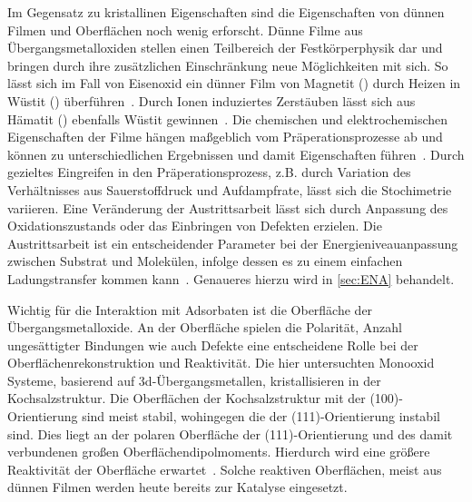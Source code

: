         Im Gegensatz zu kristallinen Eigenschaften sind die Eigenschaften von dünnen Filmen und Oberflächen noch wenig erforscht.
        Dünne Filme aus Übergangsmetalloxiden stellen einen Teilbereich der Festkörperphysik dar und bringen durch ihre zusätzlichen Einschränkung neue Möglichkeiten mit sich.
        So lässt sich im Fall von Eisenoxid ein dünner Film von Magnetit () durch Heizen in Wüstit () überführen~\cite{FeO_1}.
        Durch Ionen induziertes Zerstäuben lässt sich aus Hämatit () ebenfalls Wüstit gewinnen~\cite{FeO_36}.
        Die chemischen und elektrochemischen Eigenschaften der Filme hängen maßgeblich vom Präperationsprozesse ab und können zu unterschiedlichen Ergebnissen und damit Eigenschaften führen~\cite{Uni-Tübingen}.
        Durch gezieltes Eingreifen in den Präperationsprozess, z.B. durch Variation des Verhältnisses aus Sauerstoffdruck und Aufdampfrate, lässt sich die Stochimetrie variieren.
        Eine Veränderung der Austrittsarbeit lässt sich durch Anpassung des Oxidationszustands oder das Einbringen von Defekten erzielen.
        Die Austrittsarbeit ist ein entscheidender Parameter bei der Energieniveauanpassung zwischen Substrat und Molekülen, infolge dessen es zu einem einfachen Ladungstransfer kommen kann~\cite{IF_3}.
        Genaueres hierzu wird in \autoref{sec:ENA} behandelt.

        Wichtig für die Interaktion mit Adsorbaten ist die Oberfläche der Übergangsmetalloxide.
        An der Oberfläche spielen die Polarität, Anzahl ungesättigter Bindungen wie auch Defekte eine entscheidene Rolle bei der Oberflächenrekonstruktion und Reaktivität.
        Die hier untersuchten Monooxid Systeme, basierend auf 3d-Übergangsmetallen, kristallisieren in der Kochsalzstruktur.
        Die Oberflächen der Kochsalzstruktur mit der (100)-Orientierung sind meist stabil, wohingegen die der (111)-Orientierung instabil sind.
        Dies liegt an der polaren Oberfläche der (111)-Orientierung und des damit verbundenen großen Oberflächendipolmoments.
        Hierdurch wird eine größere Reaktivität der Oberfläche erwartet~\cite{cappus_hydroxyl_1993}.
        Solche reaktiven Oberflächen, meist aus dünnen Filmen werden heute bereits zur Katalyse eingesetzt.
    
